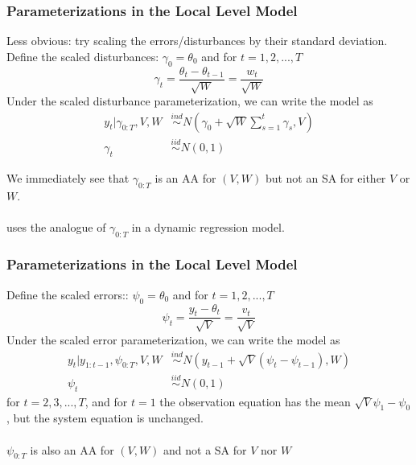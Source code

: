 \documentclass[xcolor=dvipsnames]{beamer}\usepackage{graphicx, color}
\begin{document}
\begin{frame}
  \frametitle{Parameterizations in the Local Level Model}
Less obvious: try scaling the errors/disturbances by their standard deviation. Define the scaled disturbances: $\gamma_0=\theta_0$ and for $t=1,2,...,T$ 
    \[
    \gamma_t =\frac{\theta_t - \theta_{t-1}}{\sqrt{W}} = \frac{w_t}{\sqrt{W}}
    \]
    \pause
Under the scaled disturbance parameterization, we can write the model as
\begin{align*}
  y_t|\gamma_{0:T},V,W & \stackrel{ind}{\sim} N(\gamma_0 + \sqrt{W}\textstyle\sum_{s=1}^t\gamma_s, V)\\
  \gamma_t & \stackrel{iid}{\sim}N(0,1)
\end{align*}

We immediately see that $\gamma_{0:T}$ is an AA for $(V,W)$ but not an SA for either $V$ or $W$.\\~\\

\citet{fruhwirth2004efficient} uses the analogue of $\gamma_{0:T}$ in a dynamic regression model.
\end{frame}

\begin{frame}
  \frametitle{Parameterizations in the Local Level Model}
  Define the scaled errors:: $\psi_0=\theta_0$ and for $t=1,2,...,T$ 
    \[
    \psi_t = \frac{y_t - \theta_{t}}{\sqrt{V}} = \frac{v_t}{\sqrt{V}}
    \]
    \pause
  Under the scaled error parameterization, we can write the model as
\begin{align*}
  y_t|y_{1:t-1},\psi_{0:T},V,W & \stackrel{ind}{\sim} N(y_{t-1} + \sqrt{V}(\psi_t - \psi_{t-1}), W)\\
  \psi_t & \stackrel{iid}{\sim}N(0,1)
\end{align*}
for $t=2,3,...,T$, and for $t=1$ the observation equation has the mean $\sqrt{V}\psi_1 - \psi_0$, but the system equation is unchanged.\\~\\

$\psi_{0:T}$ is also an AA for $(V,W)$ and not a SA for $V$ nor $W$
\end{frame}
\end{document}
